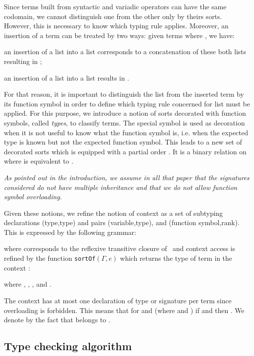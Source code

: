 \documentclass{eptcs}
\newcommand{\sortof}[2]{\texttt{sortOf}\ensuremath{(#1,#2)}}
\begin{document}
Since terms built from syntactic and variadic operators can have the same codomain, we
cannot distinguish one from the other only by theirs sorts. However, this is necessary to
know which typing rule applies. Moreover, an insertion of a term can be treated by two
ways: given terms  where , we have:
\begin{inparaenum}[1)]
\item an insertion of a list  into a list  corresponds to a
concatenation of these both lists resulting in ;
\item an insertion of a list  into a list  results in .
\end{inparaenum}
For that reason, it is important to distinguish the list from the inserted term by its
function symbol in order to define which typing rule concerned for list must be
applied. For this purpose, we introduce a notion of sorts decorated with function symbols,
called {\em types}, to classify terms. The special symbol  is used as decoration when
it is not useful to know what the function symbol is, i.e. when the expected type is known
but not the expected function symbol. This leads to a new set of decorated sorts 
which is equipped with a partial order . It is a binary relation on  where
 is equivalent to .

\textit{As pointed out in the introduction, we assume in all that paper that the
  signatures considered do not have multiple inheritance and that we do not allow function
  symbol overloading.} 

Given these notions, we refine the notion of context  as a set of subtyping
declarations (type,type) and pairs (variable,type), and (function symbol,rank). This is
expressed by the following grammar:

where  corresponds to the reflexive transitive closure of~ and context access is refined by the function \sortof{\Gamma}{e}  which returns the type of term  in the context :

where , , ,  and
.
 
The context has at most one declaration of type or signature per term since overloading is
forbidden. This means that for  and  (where
 and ) if  and  then . We denote
by 
the fact that 
 belongs to .

\subsection{Type checking algorithm}
\label{subsec:checking_algo}
\end{document}
